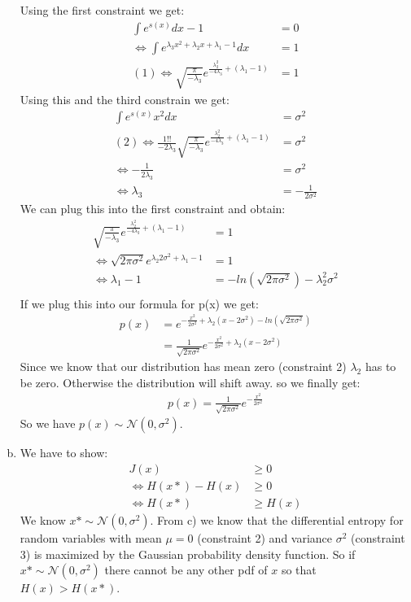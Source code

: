 \documentclass[10pt,a4paper]{article}
\begin{document}
\begin{enumerate}[(a)]
Using the first constraint we get:
\begin{align*}
    \int e^{s(x)} dx -1 &= 0\\
    \Leftrightarrow \int e^{\lambda_3 x^2+\lambda_2 x + \lambda_1 - 1}dx &= 1\\
   (1) \Leftrightarrow \sqrt{\frac{\pi}{-\lambda_3}}e^{\frac{\lambda_2^2}{-4\lambda_3}+(\lambda_1-1)} &= 1
\end{align*}
Using this and the third constrain we get:
\begin{align*}
    \int e^{s(x)} x^2dx &= \sigma^2\\
   (2) \Leftrightarrow \frac{1!!}{-2\lambda_3} \sqrt{\frac{\pi}{-\lambda_3}}e^{\frac{\lambda_2^2}{-4\lambda_3}+(\lambda_1-1)} &= \sigma^2\\
   \Leftrightarrow -\frac{1}{2\lambda_3} &= \sigma^2\\
   \Leftrightarrow \lambda_3 &= -\frac{1}{2\sigma^2}
\end{align*}
We can plug this into the first constraint and obtain:
\begin{align*}
    \sqrt{\frac{\pi}{-\lambda_3}}e^{\frac{\lambda_2^2}{-4\lambda_3}+(\lambda_1-1)} &= 1\\
    \Leftrightarrow \sqrt{2\pi\sigma^2}e^{\lambda_2 2\sigma^2+\lambda_1-1} &= 1\\
     \Leftrightarrow \lambda_1 -1 &= -ln(\sqrt{2\pi\sigma^2})-\lambda_2^2\sigma^2\\
\end{align*}
If we plug this into our formula for p(x) we get:
\begin{align*}
    p(x) &= e^{-\frac{x^2}{2\sigma^2}+\lambda_2(x-2\sigma^2)-ln(\sqrt{2\pi\sigma^2})}\\
    &= \frac{1}{\sqrt{2\pi\sigma^2}}e^{-\frac{x^2}{2\sigma^2}+\lambda_2(x-2\sigma^2)}
\end{align*}
Since we know that our distribution has mean zero (constraint 2) $\lambda_2$ has to be zero. Otherwise the distribution will shift away. so we finally get:
\begin{align*}
    p(x) = \frac{1}{\sqrt{2\pi\sigma^2}}e^{-\frac{x^2}{2\sigma^2}}
\end{align*}
So we have $p(x) \sim \mathcal{N}(0,\sigma^2)$.

\item
We have to show:
\begin{align*}
    J(x) &\ge 0\\
    \Leftrightarrow H(x*)-H(x) &\ge 0\\
    \Leftrightarrow H(x*) &\ge H(x)
\end{align*}
We know $x* \sim \mathcal{N}(0,\sigma^2)$. From c) we know that the differential entropy for random variables with mean $\mu = 0$ (constraint 2) and variance $\sigma^2$ (constraint 3) is maximized by the Gaussian probability density function. So if $x* \sim \mathcal{N}(0,\sigma^2)$ there cannot be any other pdf of $x$ so that $H(x) > H(x*)$.


\end{enumerate}
\end{document}
